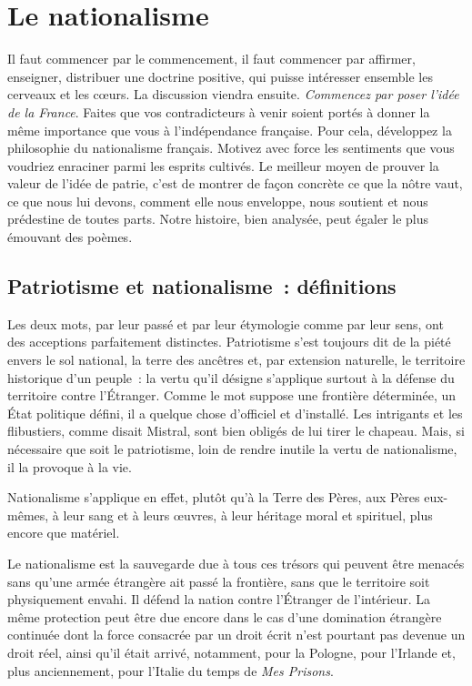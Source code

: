 \documentclass[french,twoside]{book} %
\newcommand{\astermono}{\medskip\centerline{\color{rubric}\large\selectfont{\syms ✻}}\medskip\par}%
\begin{document}
\section[Le nationalisme]{Le nationalisme}
\noindent Il faut commencer par le commencement, il faut commencer par affirmer, enseigner, distribuer une doctrine positive, qui puisse intéresser ensemble les cerveaux et les cœurs. La discussion viendra ensuite. \emph{Commencez par poser l’idée de la France}. Faites que vos contradicteurs à venir soient portés à donner la même importance que vous à l’indépendance française. Pour cela, développez la philosophie du nationalisme français. Motivez avec force les sentiments que vous voudriez enraciner parmi les esprits cultivés. Le meilleur moyen de prouver la valeur de l’idée de patrie, c’est de montrer de façon concrète ce que la nôtre vaut, ce que nous lui devons, comment elle nous enveloppe, nous soutient et nous prédestine de toutes parts. Notre histoire, bien analysée, peut égaler le plus émouvant des poèmes.\par

\astermono

\subsection[Patriotisme et nationalisme : définitions]{Patriotisme et nationalisme : définitions}
\noindent Les deux mots, par leur passé et par leur étymologie comme par leur sens, ont des acceptions parfaitement distinctes. Patriotisme s’est toujours dit de la piété envers le sol national, la terre des ancêtres et, par extension naturelle, le territoire historique d’un peuple : la vertu qu’il désigne s’applique surtout à la défense du territoire contre l’Étranger. Comme le mot suppose une frontière déterminée, un État politique défini, il a quelque chose d’officiel et d’installé. Les intrigants et les flibustiers, comme disait Mistral, sont bien obligés de lui tirer le chapeau. Mais, si nécessaire que soit le patriotisme, loin de rendre inutile la vertu de nationalisme, il la provoque à la vie.\par
Nationalisme s’applique en effet, plutôt qu’à la Terre des Pères, aux Pères eux-mêmes, à leur sang et à leurs œuvres, à leur héritage moral et spirituel, plus encore que matériel.\par
Le nationalisme est la sauvegarde due à tous ces trésors qui peuvent être menacés sans qu’une armée étrangère ait passé la frontière, sans que le territoire soit physiquement envahi. Il défend la nation contre l’Étranger de l’intérieur. La même protection peut être due encore dans le cas d’une domination étrangère continuée dont la force consacrée par un droit écrit n’est pourtant pas devenue un droit réel, ainsi qu’il était arrivé, notamment, pour la Pologne, pour l’Irlande et, plus anciennement, pour l’Italie du temps de \emph{Mes Prisons}.\par
\end{document}
